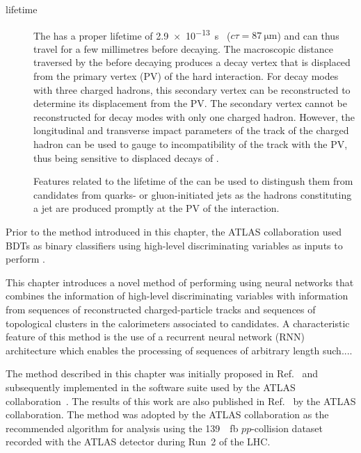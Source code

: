 \begin{description}
\item[\taulepton lifetime] The \taulepton has a proper lifetime of
  \SI{2.9e-13}{\second}~\cite{pdg2020}
  ($c \tau = \SI{87}{\micro\metre}$) and can thus travel for a few
  millimetres before decaying. The macroscopic distance traversed by
  the \taulepton before decaying produces a decay vertex that is
  displaced from the primary vertex (PV) of the hard interaction. For
  \taulepton decay modes with three charged hadrons, this secondary
  vertex can be reconstructed to determine its displacement from the
  PV. The secondary vertex cannot be reconstructed for decay modes
  with only one charged hadron. However, the longitudinal and
  transverse impact parameters of the track of the charged hadron can
  be used to gauge to incompatibility of the track with the PV, thus
  being sensitive to displaced decays of \tauleptons.

  Features related to the lifetime of the \taulepton can be used to
  distingush them from \tauhadvis candidates from quarks- or
  gluon-initiated jets as the hadrons constituting a jet are produced
  promptly at the PV of the interaction.
\end{description}
Prior to the method introduced in this chapter, the ATLAS
collaboration used BDTs as binary classifiers using high-level
discriminating variables as inputs to perform \tauid.

This chapter introduces a novel method of performing \tauid using
neural networks that combines the information of high-level
discriminating variables with information from sequences of
reconstructed charged-particle tracks and sequences of topological
clusters in the calorimeters associated to \tauhadvis candidates. A
characteristic feature of this method is the use of a recurrent neural
network (RNN) architecture which enables the processing of sequences
of arbitrary length such....

The method described in this chapter was initially proposed in
Ref.~\cite{cdeutsch-master} and subsequently implemented in the
software suite used by the ATLAS
collaboration~\cite{ATL-SOFT-PUB-2021-001}. The results of this work
are also published in Ref.~\cite{ATL-PHYS-PUB-2019-033} by the ATLAS
collaboration. The method was adopted by the ATLAS collaboration as
the recommended \tauid algorithm for analysis using the
\SI{139}{\per\femto\barn} $pp$-collision dataset recorded with the
ATLAS detector during Run~2 of the LHC.

